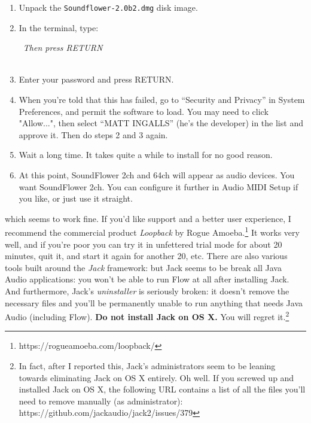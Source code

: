 \documentclass{article}
\newcommand\name{Flow}
\begin{document}
\begin{itemize}
{\begin{enumerate}
\item Unpack the {\tt Soundflower-2.0b2.dmg} disk image.
\item In the terminal, type:
\begin{tabbing}
~\hspace{5em}{\tt cd /Volumes/Soundflower-2.0b2}\hspace{2in}\= {\it Then press RETURN}\\
~\hspace{5em}{\tt sudo installer -pkg Soundflower.pkg -target /}
\end{tabbing}
\item Enter your password and press RETURN.
\item When you're told that this has failed, go to ``Security and Privacy'' in System Preferences, and permit the software to load.  You may need to click "Allow...", then select ``MATT INGALLS'' (he's the developer) in the list and approve it.  Then do steps 2 and 3 again.
\item Wait a long time.  It takes quite a while to install for no good reason.
\item At this point, SoundFlower 2ch and 64ch will appear as audio devices.  You want SoundFlower 2ch.  You can configure it further in Audio MIDI Setup if you like, or just use it straight.
\end{enumerate}
}
which seems to work fine.  If you'd like support and a better user experience, I recommend the commercial product {\it Loopback} by Rogue Amoeba.\footnote{https:/\!/rogueamoeba.com/loopback/}  It works very well, and if you're poor you can try it in unfettered trial mode for about 20 minutes, quit it, and start it again for another 20, etc.   There are also various tools built around the {\it Jack} framework: but Jack seems to be break all Java Audio applications: you won't be able to run {\name} at all after installing Jack.  And furthermore, Jack's {\it uninstaller} is seriously broken: it doesn't remove the necessary files and you'll be permanently unable to run anything that needs Java Audio (including {\name}).  {\color{red}\bf Do not install Jack on OS X.}  You will regret it.\footnote{In fact, after I reported this, Jack's administrators seem to be leaning towards eliminating Jack on OS X entirely.  Oh well.  If you screwed up and installed Jack on OS X, the following URL contains a list of all the files you'll need to remove manually (as administrator): https:/\!/github.com/jackaudio/jack2/issues/379}


\end{itemize}
\end{document}
